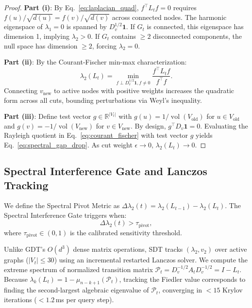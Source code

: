 \documentclass[10pt, onecolumn]{article}
\DeclareMathOperator{\vol}{vol}
\newcommand{\R}{\mathbb{R}}
\begin{document}
\begin{proof}
\textbf{Part (i)}: By Eq.~\eqref{eq:laplacian_quad}, $f^\top L_t f = 0$ requires $f(u)/\sqrt{d(u)} = f(v)/\sqrt{d(v)}$ across connected nodes. The harmonic eigenspace of $\lambda_1 = 0$ is spanned by $D_v^{1/2} \mathbf{1}$. If $G_t$ is connected, this eigenspace has dimension 1, implying $\lambda_2 > 0$. If $G_t$ contains $\ge 2$ disconnected components, the null space has dimension $\ge 2$, forcing $\lambda_2 = 0$.

\textbf{Part (ii)}: By the Courant-Fischer min-max characterization:
\begin{equation}
  \lambda_2(L_t) = \min_{f \perp D_v^{1/2}\mathbf{1}, f \ne 0} \frac{f^\top L_t f}{f^\top f}.
  \label{eq:courant_fischer}
\end{equation}
Connecting $v_{\text{new}}$ to active nodes with positive weights increases the quadratic form across all cuts, bounding perturbations via Weyl's inequality.

\textbf{Part (iii)}: Define test vector $g \in \R^{|V_t|}$ with $g(u) = 1/\vol(V_{\text{old}})$ for $u \in V_{\text{old}}$ and $g(v) = -1/\vol(V_{\text{new}})$ for $v \in V_{\text{new}}$. By design, $g^\top D_v \mathbf{1} = 0$. Evaluating the Rayleigh quotient in Eq.~\eqref{eq:courant_fischer} with test vector $g$ yields Eq.~\eqref{eq:spectral_gap_drop}. As cut weight $\epsilon \to 0$, $\lambda_2(L_t) \to 0$.
\end{proof}

\subsection{Spectral Interference Gate and Lanczos Tracking}
We define the Spectral Pivot Metric as $\Delta \lambda_2(t) = \lambda_2(L_{t-1}) - \lambda_2(L_t)$. The Spectral Interference Gate triggers when:
\begin{equation}
  \Delta \lambda_2(t) > \tau_{\text{pivot}},
  \label{eq:gate_trigger}
\end{equation}
where $\tau_{\text{pivot}} \in (0, 1)$ is the calibrated sensitivity threshold. 

Unlike GDT's $O(d^3)$ dense matrix operations, SDT tracks $(\lambda_2, v_2)$ over active graphs ($|V_t| \le 30$) using an incremental restarted Lanczos solver. We compute the extreme spectrum of normalized transition matrix $\mathcal{P}_t = D_v^{-1/2} A_t D_v^{-1/2} = I - L_t$. Because $\lambda_k(L_t) = 1 - \mu_{n-k+1}(\mathcal{P}_t)$, tracking the Fiedler value corresponds to finding the second-largest algebraic eigenvalue of $\mathcal{P}_t$, converging in $<15$ Krylov iterations ($<1.2$\,ms per query step).
\end{document}
